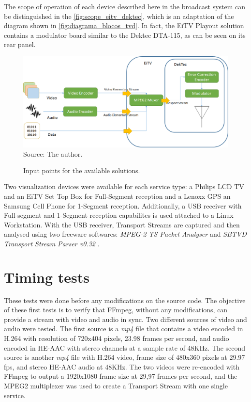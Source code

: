 \documentclass[
	12pt,				%
	openright,			%
	twoside,			%
	a4paper,			%
	brazil,
	french,				%
	english
	]{abntex2}
\begin{document}
The scope of operation of each device described here in the broadcast system can be distinguished in the \autoref{fig:scope_eitv_dektec}, which is an adaptation of the diagram shown in \autoref{fig:diagrama_blocos_tvd}. In fact, the EiTV Playout solution contains a modulator board similar to the Dektec DTA-115, as can be seen on its rear panel.

\begin{figure}[!hb]
\centering
\caption{Input points for the available solutions.}
\includegraphics[width=1\linewidth]{figuras/scope_eitv_dektec.png}
\\Source: The author.
\label{fig:scope_eitv_dektec}
\end{figure}

Two visualization devices were available for each service type: a Philips LCD TV and an EiTV Set Top Box for Full-Segment reception and a Lenoxx GPS an Samsung Cell Phone for 1-Segment reception. Additionally, a USB receiver with Full-segment and 1-Segment reception capabilites is used attached to a Linux Workstation. With the USB receiver, Transport Streams are captured and then analysed using two freeware softwares: \textit{MPEG-2 TS Packet Analyser} \cite{} and \textit{SBTVD Transport Stream Parser v0.32} \cite{}.

\section{Timing tests}

These tests were done before any modifications on the source code. The objective of these first tests is to verify that FFmpeg, without any modifications, can provide a stream with video and audio in sync. Two different sources of video and audio were tested. The first source is a \textit{mp4} file that contains a video encoded in H.264 with resolution of 720x404 pixels, 23.98 frames per second, and audio encoded in HE-AAC with stereo channels at a sample rate of 48KHz. The second source is another \textit{mp4} file with H.264 video, frame size of 480x360 pixels at 29.97 fps, and stereo HE-AAC audio at 48KHz. The two videos were re-encoded with FFmpeg to output a 1920x1080 frame size at 29,97 frames per second, and the MPEG2 multiplexer was used to create a Transport Stream with one single service.
\end{document}
